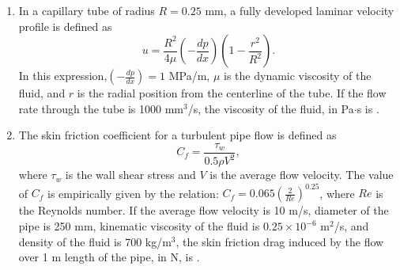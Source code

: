 \documentclass[journal,12pt,onecolumn]{IEEEtran}
\theoremstyle{remark}
\begin{document}
\begin{enumerate}

 \item In a capillary tube of radius $R = 0.25$ mm, a fully developed laminar velocity profile is defined as 
 $$u = \frac{R^2}{4 \mu} (-\frac{dp}{dx})(1-\frac{r^2}{R^2}).$$
 In this expression,$(-\frac{dp}{dx}) = 1$ MPa/m, $\mu$ is the dynamic viscosity of the fluid, and $r$ is the radial position from the centerline of the tube. If the flow rate through the tube is 1000 mm$^3$/s, the viscosity of the fluid, in Pa$\cdot$s is {\underline{\hspace{2cm}}}.

    \item The skin friction coefficient for a turbulent pipe flow is defined as 
    $$C_f = \frac{\tau_w}{0.5 \rho V^2},$$ where $\tau_w$ is the wall shear stress and $V$ is the average flow velocity. The value of $C_f$ is empirically given by the relation: $C_f = 0.065(\frac{2}{Re})^{0.25}$, where $Re$ is the Reynolds number. If the average flow velocity is 10 m/s, diameter of the pipe is 250 mm, kinematic viscosity of the fluid is $0.25 \times 10^{-6}$ m$^2$/s, and density of the fluid is 700 kg/m$^3$, the skin friction drag induced by the flow over 1 m length of the pipe, in N, is {\underline{\hspace{2cm}}}.


\end{enumerate}
\end{document}
